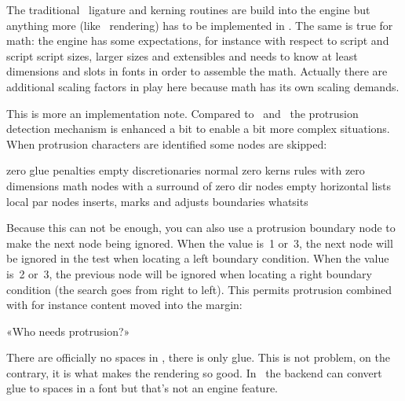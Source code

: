 \stopsection

\startsection[title={Callbacks}]

The traditional \TEX\ ligature and kerning routines are build into the engine but
anything more (like \OPENTYPE\ rendering) has to be implemented in \LUA. The same
is true for math: the engine has some expectations, for instance with respect to
script and script script sizes, larger sizes and extensibles and needs to know at
least dimensions and slots in fonts in order to assemble the math. Actually there
are additional scaling factors in play here because math has its own scaling
demands.

\stopsection

\startsection[title=Protrusion]

This is more an implementation note. Compared to \PDFTEX\ and \LUATEX\ the
protrusion detection mechanism is enhanced a bit to enable a bit more complex
situations. When protrusion characters are identified some nodes are skipped:

\startitem zero glue \stopitem
\startitem penalties \stopitem
\startitem empty discretionaries \stopitem
\startitem normal zero kerns \stopitem
\startitem rules with zero dimensions \stopitem
\startitem math nodes with a surround of zero \stopitem
\startitem dir nodes \stopitem
\startitem empty horizontal lists \stopitem
\startitem local par nodes \stopitem
\startitem inserts, marks and adjusts \stopitem
\startitem boundaries \stopitem
\startitem whatsits \stopitem
\stopitemize

Because this can not be enough, you can also use a protrusion boundary node to
make the next node being ignored. When the value is~1 or~3, the next node will be
ignored in the test when locating a left boundary condition. When the value is~2
or~3, the previous node will be ignored when locating a right boundary condition
(the search goes from right to left). This permits protrusion combined with for
instance content moved into the margin:

\starttyping
{}\llap{!\quad}«Who needs protrusion?»
\stoptyping

\stopsection

\startsection[title=Spaces]

There are officially no spaces in \TEX, there is only glue. This is not problem,
on the contrary, it is what makes the rendering so good. In \CONTEXT\ the backend
can convert glue to spaces in a font but that's not an engine feature.

